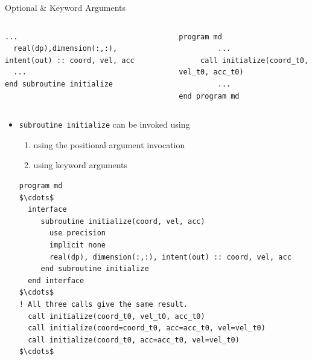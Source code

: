 \documentclass[c,mathserif,compress,xcolor=svgnames]{beamer}
\newcommand{\lstfortran}[1]{\lstinline[language={[90]Fortran},basicstyle=\footnotesize\ttfamily]|#1|}
\begin{document}
\begin{frame}{Optional \& Keyword Arguments}
\begin{columns}
\begin{lstlisting}[language={[90]Fortran},basicstyle=\fontsize{5}{6}\selectfont\ttfamily]
  ...
  real(dp),dimension(:,:), intent(out) :: coord, vel, acc
  ...
end subroutine initialize
    \end{lstlisting}
    \column{5.5cm}
    \begin{lstlisting}[language={[90]Fortran},basicstyle=\fontsize{5}{6}\selectfont\ttfamily]
program md
         ...
     call initialize(coord_t0, vel_t0, acc_t0)
         ...
end program md
    \end{lstlisting}
  \end{columns}
  \framebreak
  \begin{itemize}
    \item \lstfortran{subroutine initialize} can be invoked using 
    \begin{enumerate}
      \item using the positional argument invocation
      \item using keyword arguments
    \end{enumerate}
    \begin{lstlisting}[language={[90]Fortran},basicstyle=\fontsize{7}{8}\selectfont\ttfamily,mathescape]
program md
$\cdots$
  interface
     subroutine initialize(coord, vel, acc)
       use precision
       implicit none
       real(dp), dimension(:,:), intent(out) :: coord, vel, acc
     end subroutine initialize
  end interface
$\cdots$
! All three calls give the same result.
  call initialize(coord_t0, vel_t0, acc_t0)
  call initialize(coord=coord_t0, acc=acc_t0, vel=vel_t0)
  call initialize(coord_t0, acc=acc_t0, vel=vel_t0)
$\cdots$
    \end{lstlisting}
  \end{itemize}
\end{frame}
\end{document}
